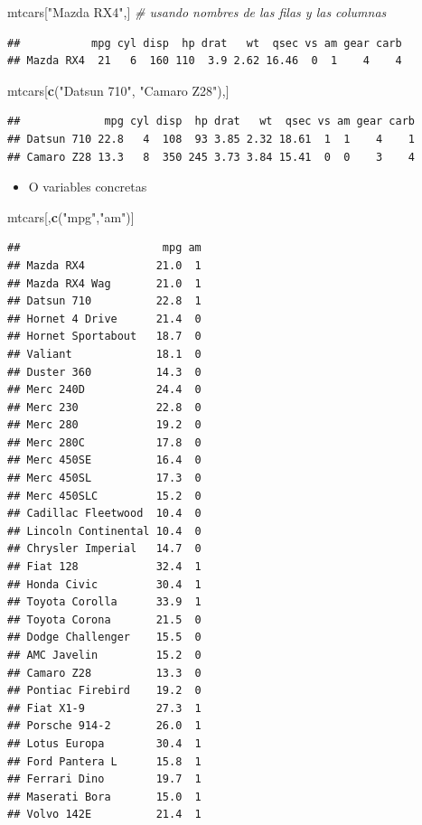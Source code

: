 \documentclass[]{book}
\newenvironment{Shaded}{\begin{snugshade}}{\end{snugshade}}
\newcommand{\KeywordTok}[1]{\textcolor[rgb]{0.13,0.29,0.53}{\textbf{#1}}}
\newcommand{\StringTok}[1]{\textcolor[rgb]{0.31,0.60,0.02}{#1}}
\newcommand{\CommentTok}[1]{\textcolor[rgb]{0.56,0.35,0.01}{\textit{#1}}}
\newcommand{\NormalTok}[1]{#1}
\providecommand{\tightlist}{%
  \setlength{\itemsep}{0pt}\setlength{\parskip}{0pt}}
\begin{document}
\begin{Shaded}
\begin{Highlighting}[]
\NormalTok{mtcars[}\StringTok{"Mazda RX4"}\NormalTok{,] }\CommentTok{# usando nombres de las filas y las columnas}
\end{Highlighting}
\end{Shaded}

\begin{verbatim}
##           mpg cyl disp  hp drat   wt  qsec vs am gear carb
## Mazda RX4  21   6  160 110  3.9 2.62 16.46  0  1    4    4
\end{verbatim}

\begin{Shaded}
\begin{Highlighting}[]
\NormalTok{mtcars[}\KeywordTok{c}\NormalTok{(}\StringTok{"Datsun 710"}\NormalTok{, }\StringTok{"Camaro Z28"}\NormalTok{),] }
\end{Highlighting}
\end{Shaded}

\begin{verbatim}
##             mpg cyl disp  hp drat   wt  qsec vs am gear carb
## Datsun 710 22.8   4  108  93 3.85 2.32 18.61  1  1    4    1
## Camaro Z28 13.3   8  350 245 3.73 3.84 15.41  0  0    3    4
\end{verbatim}

\begin{itemize}
\tightlist
\item
  O variables concretas
\end{itemize}

\begin{Shaded}
\begin{Highlighting}[]
\NormalTok{mtcars[,}\KeywordTok{c}\NormalTok{(}\StringTok{"mpg"}\NormalTok{,}\StringTok{"am"}\NormalTok{)]}
\end{Highlighting}
\end{Shaded}

\begin{verbatim}
##                      mpg am
## Mazda RX4           21.0  1
## Mazda RX4 Wag       21.0  1
## Datsun 710          22.8  1
## Hornet 4 Drive      21.4  0
## Hornet Sportabout   18.7  0
## Valiant             18.1  0
## Duster 360          14.3  0
## Merc 240D           24.4  0
## Merc 230            22.8  0
## Merc 280            19.2  0
## Merc 280C           17.8  0
## Merc 450SE          16.4  0
## Merc 450SL          17.3  0
## Merc 450SLC         15.2  0
## Cadillac Fleetwood  10.4  0
## Lincoln Continental 10.4  0
## Chrysler Imperial   14.7  0
## Fiat 128            32.4  1
## Honda Civic         30.4  1
## Toyota Corolla      33.9  1
## Toyota Corona       21.5  0
## Dodge Challenger    15.5  0
## AMC Javelin         15.2  0
## Camaro Z28          13.3  0
## Pontiac Firebird    19.2  0
## Fiat X1-9           27.3  1
## Porsche 914-2       26.0  1
## Lotus Europa        30.4  1
## Ford Pantera L      15.8  1
## Ferrari Dino        19.7  1
## Maserati Bora       15.0  1
## Volvo 142E          21.4  1
\end{verbatim}
\end{document}
